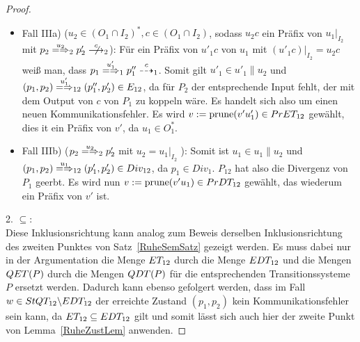 \begin{proof}
\begin{itemize}
\begin{itemize}
        \item Fall IIIa) \big($u_2\in (O_1\cap I_2)^*,c\in (O_1\cap I_2)$,
          sodass $u_2c$ ein Präfix von $u_1|_{I_2}$ mit $p_2\weakmay[u_2]_2
          p'_2 \nmust[c]_2$\big): Für ein Präfix von $u'_1c$ von $u_1$ mit
          $(u'_1c)|_{I_2}=u_2c$ weiß man, dass $p_1\weakmay[u'_1]_1 p''_1
          \may[c]_1$. Somit gilt $u'_1\in u'_1\|u_2$ und $(p_1,p_2)
          \weakmay[u'_1]_{12} (p''_1,p'_2)\in E_{12}$, da für $P_2$ der
          entsprechende Input fehlt, der mit dem Output von $c$ von $P_1$ zu
          koppeln wäre. Es handelt sich also um einen neuen
          Kommunikationsfehler. Es wird $v:=\mathrm{prune} (v'u'_1) \in PrET _{12}$
          gewählt, dies it ein Präfix von $v'$, da $u_1\in O^*_1$.
        \item Fall IIIb) \big($p_2\weakmay[u_2]_2 p'_2$ mit $u_2=u_1|_{I_2}$
          \big): Somit ist $u_1\in u_1\|u_2$ und $(p_1,p_2)\weakmay[u_1]_{12}
          (p'_1,p'_2)\in Div _{12}$, da $p_1\in Div _1$. $P_{12}$ hat also die
          Divergenz von $P_1$ geerbt. Es wird nun $v:=\mathrm{prune} (v'u_1)\in PrDT
          _{12}$ gewählt, das wiederum ein Präfix von $v'$ ist.
      \end{itemize}
  \end{itemize}

  2. \glqq$\subseteq$\grqq{}:\\
  Diese Inklusionsrichtung kann analog zum Beweis derselben Inklusionsrichtung
  des zweiten Punktes von Satz~\ref{RuheSemSatz} gezeigt werden. Es muss dabei
  nur in der Argumentation die Menge $ET _{12}$ durch die Menge $EDT _{12}$
  und die Mengen $QET (P)$ durch die Mengen $QDT (P)$ für die entsprechenden
  Transitionssysteme $P$ ersetzt werden. Dadurch kann ebenso gefolgert werden,
  dass im Fall $w\in StQT _{12}\backslash EDT _{12}$ der erreichte Zustand
  $(p_1,p_2)$ kein Kommunikationsfehler sein kann, da $ET _{12}\subseteq EDT
  _{12}$ gilt und somit lässt sich auch hier der zweite Punkt von
  Lemma~\ref{RuheZustLem} anwenden.


\end{proof}
